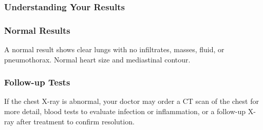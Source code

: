 \subsubsection*{Understanding Your Results}

\subsubsection*{Normal Results}
A normal result shows clear lungs with no infiltrates, masses, fluid, or pneumothorax. Normal heart size and mediastinal contour.

\subsubsection*{Follow-up Tests}
If the chest X-ray is abnormal, your doctor may order a CT scan of the chest for more detail, blood tests to evaluate infection or inflammation, or a follow-up X-ray after treatment to confirm resolution.
\clearpage
